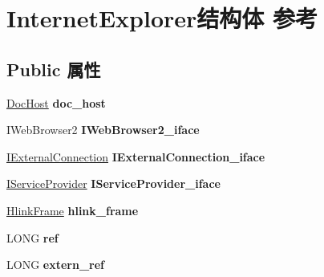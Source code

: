 \hypertarget{struct_internet_explorer}{}\section{Internet\+Explorer结构体 参考}
\label{struct_internet_explorer}
\subsection*{Public 属性}
\begin{DoxyCompactItemize}
\item 
\mbox{\label{struct_internet_explorer_a6d5c339569c8c9b66abbde5180c56f9d}} 
\hyperlink{struct_doc_host}{Doc\+Host} {\bfseries doc\+\_\+host}
\item 
\mbox{\label{struct_internet_explorer_adb3eb405d11021d66f627ba81e5ec432}} 
I\+Web\+Browser2 {\bfseries I\+Web\+Browser2\+\_\+iface}
\item 
\mbox{\label{struct_internet_explorer_aebdcf29477999434fa35e8417efeffd8}} 
\hyperlink{interface_i_external_connection}{I\+External\+Connection} {\bfseries I\+External\+Connection\+\_\+iface}
\item 
\mbox{\label{struct_internet_explorer_a03565fd028497af8752ebbf87221a5d8}} 
\hyperlink{interface_i_service_provider}{I\+Service\+Provider} {\bfseries I\+Service\+Provider\+\_\+iface}
\item 
\mbox{\label{struct_internet_explorer_a9bf62199966cca07045dd05433095940}} 
\hyperlink{struct_hlink_frame}{Hlink\+Frame} {\bfseries hlink\+\_\+frame}
\item 
\mbox{\label{struct_internet_explorer_a5498692ffa7e393fd4776cf50e94efa1}} 
L\+O\+NG {\bfseries ref}
\item 
\mbox{\label{struct_internet_explorer_a969e45dce735cbad17598a00b45cd7cd}} 
L\+O\+NG {\bfseries extern\+\_\+ref}
\item 
\mbox{\label{struct_internet_explorer_a1b9d7bc78929bdc67499fea9d029065a}} 

\end{DoxyCompactItemize}

